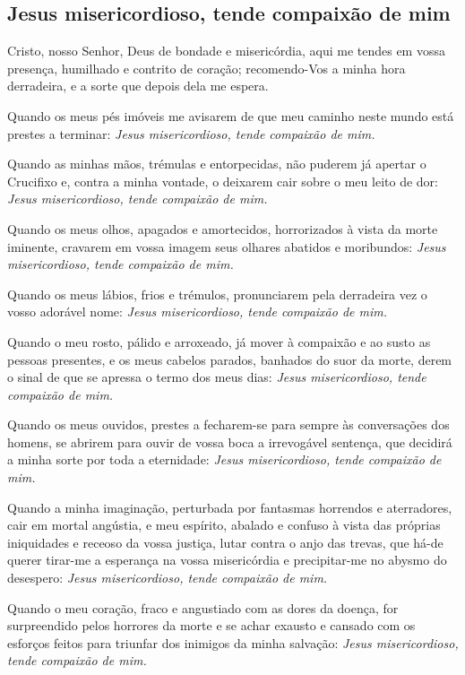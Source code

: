 \subsection{Jesus misericordioso, tende compaixão de mim}
 Cristo, nosso Senhor, Deus de bondade e misericórdia, aqui me tendes em vossa presença, humilhado e contrito de coração; recomendo-Vos a minha hora derradeira, e a sorte que depois dela me espera.\par
Quando os meus pés imóveis me avisarem de que meu caminho neste mundo está prestes a terminar: \textit{Jesus misericordioso, tende compaixão de mim.}\par
Quando as minhas mãos, trémulas e entorpecidas, não puderem já apertar o Crucifixo e, contra a minha vontade, o deixarem cair sobre o meu leito de dor: \textit{Jesus misericordioso, tende compaixão de mim.}\par
Quando os meus olhos, apagados e amortecidos, horrorizados à vista da morte iminente, cravarem em vossa imagem seus olhares abatidos e moribundos: \textit{Jesus misericordioso, tende compaixão de mim.}\par
Quando os meus lábios, frios e trémulos, pronunciarem pela derradeira vez o vosso adorável nome: \textit{Jesus misericordioso, tende compaixão de mim.}\par
Quando o meu rosto, pálido e arroxeado, já mover à compaixão e ao susto as pessoas presentes, e os meus cabelos parados, banhados do suor da morte, derem o sinal de que se apressa o termo dos meus dias: \textit{Jesus misericordioso, tende compaixão de mim.}\par
Quando os meus ouvidos, prestes a fecharem-se para sempre às conversações dos homens, se abrirem para ouvir de vossa boca a irrevogável sentença, que decidirá a minha sorte por toda a eternidade: \textit{Jesus misericordioso, tende compaixão de mim.}\par
Quando a minha imaginação, perturbada por fantasmas horrendos e aterradores, cair em mortal angústia, e meu espírito, abalado e confuso à vista das próprias iniquidades e receoso da vossa justiça, lutar contra o anjo das trevas, que há-de querer tirar-me a esperança na vossa misericórdia e precipitar-me no abysmo do desespero: \textit{Jesus misericordioso, tende compaixão de mim.}\par
Quando o meu coração, fraco e angustiado com as dores da doença, for surpreendido pelos horrores da morte e se achar exausto e cansado com os esforços feitos para triunfar dos inimigos da minha salvação: \textit{Jesus misericordioso, tende compaixão de mim.}\par
